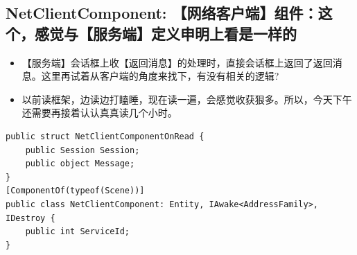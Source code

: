 \documentclass[9pt, b5paper]{article}
\begin{document}
\subsection{NetClientComponent: 【网络客户端】组件：这个，感觉与【服务端】定义申明上看是一样的}
\label{sec-8-5}
\begin{itemize}
\item 【服务端】会话框上收【返回消息】的处理时，直接会话框上返回了返回消息。这里再试着从客户端的角度来找下，有没有相关的逻辑?
\item 以前读框架，边读边打瞌睡，现在读一遍，会感觉收获狠多。所以，今天下午还需要再接着认认真真读几个小时。
\end{itemize}
\begin{verbatim}
public struct NetClientComponentOnRead {
    public Session Session;
    public object Message;
}
[ComponentOf(typeof(Scene))]
public class NetClientComponent: Entity, IAwake<AddressFamily>, IDestroy {
    public int ServiceId;
}
\end{verbatim}
\end{document}
